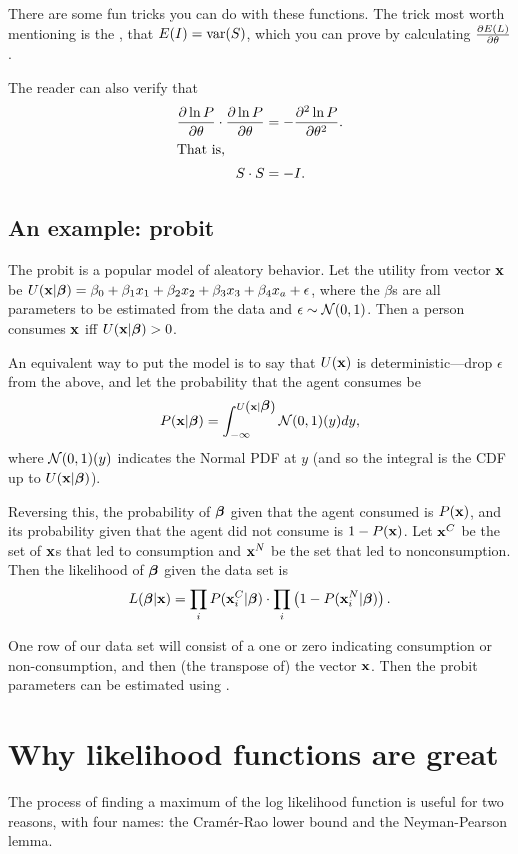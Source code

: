 There are some fun tricks you can do with these functions.
The trick most worth mentioning is the
, that $E(I)=\operatorname{var}(S)$, which you can prove by
calculating ${\partial E(L)\over \partial \theta}$.

The reader can also verify that 
\begin{align}
\frac{\partial \ln P}{\partial \theta}\cdot \frac{\partial \ln P}{\partial \theta} &= -\frac{\partial^2 \ln P}{\partial \theta^2}.\nonumber\\
\intertext{That is,}
S\cdot S &= -I.\nonumber
\end{align}


\subsection{An example: probit} 
The probit is a popular model of aleatory behavior. 
Let the utility from vector ${\bf x}$ be 
$U({\bf x}|{\mbox{\boldmath$\beta$}}) = \beta_0 + \beta_1 x_1 + \beta_2 x_2 + \beta_3 x_3 + \beta_4 x_a + \epsilon$,
where the $\beta$s are all parameters to be estimated from
the data and $\epsilon \sim {\cal N}(0,1)$.
Then a person consumes ${\bf x}$ iff $U({\bf x}|{\mbox{\boldmath$\beta$}})>0$. 

An equivalent way to put the model is to say that $U({\bf x})$ is
deterministic---drop $\epsilon$ from the above, and let the probability that
the agent consumes be
$$P({\bf x}|{\mbox{\boldmath$\beta$}}) = \int_{-\infty}^{U\left({\bf x}|{\mbox{\boldmath$\beta$}}\right)} {\cal N}(0,1)(y) dy,$$
where ${\cal N}(0,1)(y)$ indicates the Normal PDF at $y$ (and so the
integral is the CDF up to $U({\bf x}|{\mbox{\boldmath$\beta$}})$).

Reversing this, the probability of ${\mbox{\boldmath$\beta$}}$ given that the agent
consumed is $P({\bf x})$, and its probability given that the agent did not
consume is $1-P({\bf x})$. Let ${\bf x}^C$ be the set of ${\bf x}$s that led to
consumption and ${\bf x}^N$ be the set that led to nonconsumption. Then the
likelihood of ${\mbox{\boldmath$\beta$}}$ given the data set is 
$$L({\mbox{\boldmath$\beta$}}|{\bf x}) = \prod_{i} P({\bf x}^C_i|{\mbox{\boldmath$\beta$}}) \cdot \prod_{i} \left(1-P({\bf x}^N_i|{\mbox{\boldmath$\beta$}})\right).$$ 

One row of our data set will consist of a one or zero indicating
consumption or non-consumption, and then (the transpose of) the vector
${\bf x}$. Then the probit parameters can be estimated using
.

\section{Why likelihood functions are great} The process of finding a
maximum of the log likelihood function is 
useful for two reasons, with four names: the Cram\'er-Rao lower bound and
the Neyman-Pearson lemma.

